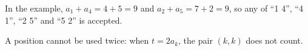 In the example, $a_1 + a_4 = 4 + 5 = 9$ and $a_2 + a_5 = 7 + 2 = 9$, so any of ``1 4'', ``4 1'', ``2 5'' and ``5 2'' is accepted.

A position cannot be used twice: when $t = 2 a_k$, the pair $(k, k)$ does not count.
